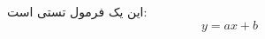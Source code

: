 \documentclass[12pt,a4paper]{report}
\begin{document}
این یک فرمول تستی است:
\begin{equation}
y = ax + b
\end{equation}
\end{document}
